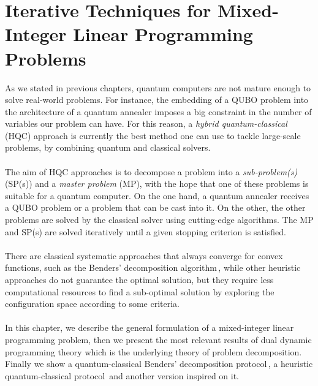 
\chapter{Iterative Techniques for Mixed-Integer Linear Programming Problems} %

\label{Chapter3} %

As we stated in previous chapters, quantum computers are not mature enough to solve real-world problems. For instance, the embedding of a QUBO problem into the architecture of a quantum annealer imposes a big constraint in the number of variables our problem can have. For this reason, a \textit{hybrid quantum-classical} (HQC) approach is currently the best method one can use to tackle large-scale problems, by combining quantum and classical solvers.\\\\
The aim of HQC approaches is to decompose a problem into a \textit{sub-problem(s)} (SP(s)) and a \textit{master problem} (MP), with the hope that one of these problems is suitable for a quantum computer. On the one hand, a quantum annealer receives a QUBO problem or a problem that can be cast into it. On the other, the other problems are solved by the classical solver using cutting-edge algorithms. The MP and SP(s) are solved iteratively until a given stopping criterion is satisfied. \\\\
There are classical systematic approaches that always converge for convex functions, such as the Benders' decomposition algorithm\,\cite{Pereira1991}, while other heuristic approaches do not guarantee the optimal solution, but they require less computational resources to find a sub-optimal solution by exploring the configuration space according to some criteria.\\\\
In this chapter, we describe the general formulation of a mixed-integer linear programming problem, then we present the most relevant results of dual dynamic programming theory which is the underlying theory of problem decomposition. Finally we show a quantum-classical Benders' decomposition protocol\,\cite{Zhao2021HybridProgramming}, a heuristic quantum-classical protocol\,\cite{Ding2019ImplementationDesign} and another version inspired on it.
\newpage
